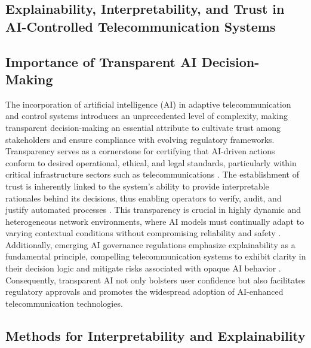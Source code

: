 \documentclass[11pt]{article}
\begin{document}
\begin{itemize}
\section{Explainability, Interpretability, and Trust in AI-Controlled Telecommunication Systems}

\subsection{Importance of Transparent AI Decision-Making}

The incorporation of artificial intelligence (AI) in adaptive telecommunication and control systems introduces an unprecedented level of complexity, making transparent decision-making an essential attribute to cultivate trust among stakeholders and ensure compliance with evolving regulatory frameworks. Transparency serves as a cornerstone for certifying that AI-driven actions conform to desired operational, ethical, and legal standards, particularly within critical infrastructure sectors such as telecommunications \cite{ref7,ref13}. The establishment of trust is inherently linked to the system’s ability to provide interpretable rationales behind its decisions, thus enabling operators to verify, audit, and justify automated processes \cite{ref15}. This transparency is crucial in highly dynamic and heterogeneous network environments, where AI models must continually adapt to varying contextual conditions without compromising reliability and safety \cite{ref48}. Additionally, emerging AI governance regulations emphasize explainability as a fundamental principle, compelling telecommunication systems to exhibit clarity in their decision logic and mitigate risks associated with opaque AI behavior \cite{ref50}. Consequently, transparent AI not only bolsters user confidence but also facilitates regulatory approvals and promotes the widespread adoption of AI-enhanced telecommunication technologies.

\subsection{Methods for Interpretability and Explainability}


\end{itemize}
\end{document}
